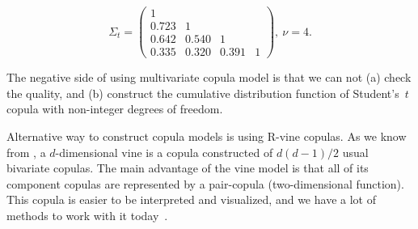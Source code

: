 \begin{equation} \label{eng:tcopfit}
    \Sigma_t = \left(
    \begin{array}{cccc}
        1 & & & \\
        0.723 & 1 & & \\
        0.642 & 0.540 & 1 & \\
        0.335 & 0.320 & 0.391 & 1
    \end{array} \right), \ \nu = 4.
\end{equation}

The negative side of using multivariate copula model is that we can not (a) check the quality, and (b) construct the cumulative distribution function of Student's~$t$ copula with non-integer degrees of freedom.

Alternative way to construct copula models is using R-vine copulas. 
As we know from \cite{Bedfort2002}, a $d$-dimensional vine is a copula constructed of $d(d - 1)/2$ usual bivariate copulas.  
The main advantage of the vine model is that all of its component copulas are represented by a pair-copula (two-dimensional function).
This copula is easier to be interpreted and visualized, and we have a lot of methods to work with it today~\cite{Cooke2015, Czado2010, Dissmann2013}. 

